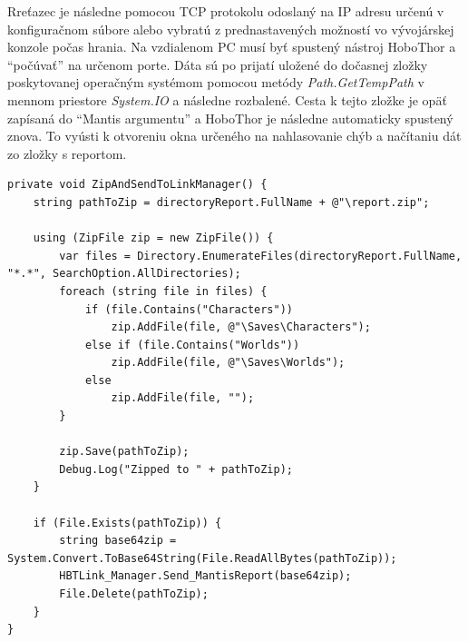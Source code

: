 \documentclass[slovak, bachelorpractice]{diploma}
\begin{document}
Rreťazec je následne pomocou TCP protokolu odoslaný na IP adresu určenú v konfiguračnom súbore alebo vybratú z prednastavených možností vo vývojárskej konzole počas hrania. Na vzdialenom PC musí byť spustený nástroj HoboThor a \enquote{počúvať} na určenom porte. Dáta sú po prijatí uložené do dočasnej zložky poskytovanej operačným systémom pomocou metódy \textit{Path.GetTempPath} v mennom priestore \textit{System.IO} a následne rozbalené. Cesta k tejto zložke je opäť zapísaná do \enquote{Mantis argumentu} a HoboThor je následne automaticky spustený znova. To vyústi k otvoreniu okna určeného na nahlasovanie chýb a načítaniu dát zo zložky s reportom.
\vspace{10pt}
\begin{lstlisting}[label=src:Zip,caption={Archivovanie zložky so zachovaním pôvodnej štruktúry}]
private void ZipAndSendToLinkManager() {
    string pathToZip = directoryReport.FullName + @"\report.zip";

    using (ZipFile zip = new ZipFile()) {
        var files = Directory.EnumerateFiles(directoryReport.FullName, "*.*", SearchOption.AllDirectories);
        foreach (string file in files) {
            if (file.Contains("Characters"))
                zip.AddFile(file, @"\Saves\Characters");
            else if (file.Contains("Worlds"))
                zip.AddFile(file, @"\Saves\Worlds");
            else
                zip.AddFile(file, "");
        }

        zip.Save(pathToZip);
        Debug.Log("Zipped to " + pathToZip);
    }

    if (File.Exists(pathToZip)) {
        string base64zip = System.Convert.ToBase64String(File.ReadAllBytes(pathToZip));
        HBTLink_Manager.Send_MantisReport(base64zip);
        File.Delete(pathToZip);
    }
}
\end{lstlisting}
\vspace{5pt}
\end{document}
